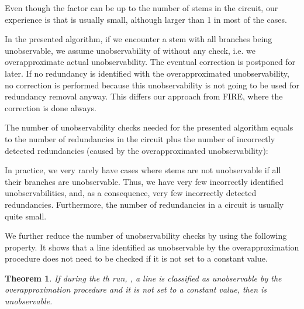 \documentclass[conference]{IEEEtran} \usepackage{times}
\newtheorem{theorem}{Theorem}
\begin{document}
Even though the factor  can be up to the number of stems in the
circuit, our experience is that  is usually small, although larger
than 1 in most of the cases.

In the presented algorithm, if we encounter a stem  with all branches being
unobservable, we assume unobservability of  without any check,
i.e. we overapproximate actual unobservability.  The eventual
correction is postponed for later.  If no redundancy is identified
with the overapproximated unobservability, no correction is performed
because this unobservability is not going to be used for redundancy
removal anyway. This differs our approach from FIRE, where the correction is
done always.

The number of unobservability checks needed for the presented algorithm equals
to the number of redundancies in the circuit plus the number of
incorrectly detected redundancies (caused by the overapproximated
unobservability):


In practice, we very rarely have cases where stems are not
unobservable if all their branches are unobservable.  Thus, we have
very few incorrectly identified unobservabilities, and, as a
consequence, very few incorrectly detected redundancies. Furthermore,
the number of redundancies in a circuit is usually quite
small. 

We further reduce the number of unobservability checks by 
using the following property. It shows that a line identified as
unobservable by the overapproximation procedure does not need to be checked
if it is not set to a constant value.


\begin{theorem} \label{th1}
If during the th run, , 
a line  is classified as unobservable by the overapproximation
procedure and it is not set to a constant value,
then  is unobservable.
\end{theorem}
\end{document}
